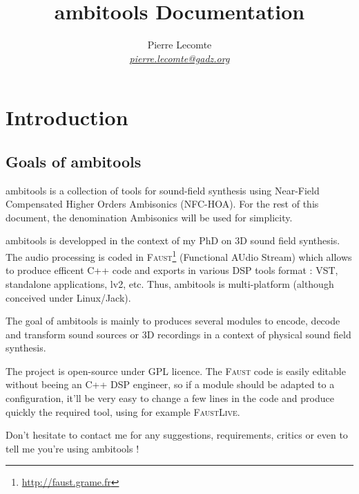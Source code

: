 \documentclass[10pt,a4paper]{article}
\author{Pierre Lecomte \\ \textit{ \href{mailto:pierre.lecomte@gadz.org}{pierre.lecomte@gadz.org}}}
\title{ambitools Documentation}
\begin{document}

\maketitle
\tableofcontents
\section{Introduction}

\subsection{Goals of ambitools}
ambitools is a collection of tools for sound-field synthesis using Near-Field Compensated Higher Orders Ambisonics (NFC-HOA). For the rest of this document, the denomination Ambisonics will be used for simplicity.

ambitools is developped in the context of my PhD on 3D sound field synthesis. The audio processing is coded in \textsc{Faust}\footnote{\url{http://faust.grame.fr}} (Functional AUdio Stream) which allows to produce efficent C++ code and exports in various DSP tools format : VST, standalone applications, lv2, etc. Thus, ambitools is multi-platform (although conceived under Linux/Jack).

The goal of ambitools is mainly to produces several modules to encode, decode and transform sound sources or 3D recordings in a context of physical sound field synthesis. 

The project is open-source under GPL licence. The \textsc{Faust} code is easily editable without beeing an C++ DSP engineer, so if a module should be adapted to a configuration, it'll be very easy to change a few lines in the code and produce quickly the required tool, using for example \textsc{FaustLive}.

Don't hesitate to contact me for any suggestions, requirements, critics or even to tell me you're using ambitools !
\end{document}
